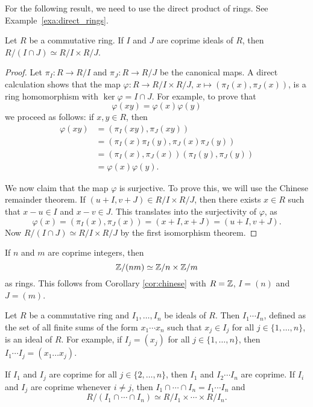 For the following result, we need 
to use the direct product of rings. See Example~\ref{exa:direct_rings}. 

\begin{corollary}
\label{cor:chinese}
	Let $R$ be a commutative ring. If $I$ and $J$ are coprime ideals of $R$, 
	then $R/(I\cap J)\simeq R/I\times R/J$.
\end{corollary}

\begin{proof}
	Let $\pi_I\colon R\to R/I$ and $\pi_J\colon R\to R/J$ be the canonical maps. A direct 
	calculation shows that the
	map $\varphi\colon R\to R/I\times R/J$, $x\mapsto (\pi_I(x),\pi_J(x))$, 
	is a ring homomorphism with $\ker\varphi=I\cap J$. For example, to prove
 that 
 \[
 \varphi(xy)=\varphi(x)\varphi(y)
 \]
 we proceed as follows: if $x,y\in R$, then 
        \begin{align*}
            \varphi(xy) &= (\pi_I(xy),\pi_J(xy))\\
            &= (\pi_I(x)\pi_I(y),\pi_J(x)\pi_J(y))\\
            &= (\pi_I(x),\pi_J(x))(\pi_I(y),\pi_J(y))\\
            &= \varphi(x)\varphi(y). 
        \end{align*}

 We now claim that the map $\varphi$ is surjective. To prove this, 
 we will use the Chinese remainder theorem. If $(u+I,v+J)\in R/I\times R/J$, 
	then there exists $x\in R$ such that 
	$x-u\in I$ and $x-v\in J$. This translates into the surjectivity of $\varphi$,
 as \[
 \varphi(x)=(\pi_I(x),\pi_J(x))=(x+I,x+J)=(u+I,v+J).
 \]
 Now
	$R/(I\cap J)\simeq R/I\times R/J$ by the first isomorphism theorem. 
\end{proof}

\begin{example}
    If $n$ and $m$ are coprime integers, then
    \[
    \mathbb{Z}/(nm)\simeq \mathbb{Z}/n\times \mathbb{Z}/m
    \]
    as rings. This follows from Corollary \ref{cor:chinese} with 
    $R=\mathbb{Z}$, $I=(n)$ and $J=(m)$. 
\end{example}

Let $R$ be a commutative ring and $I_1,\dots,I_n$ be ideals of $R$. Then
$I_1\cdots I_n$, defined as the set of all finite sums of the form 
$x_1\cdots x_n$ such that $x_j\in I_j$ for all $j\in\{1,\dots,n\}$, 
is an ideal of $R$. For example, if $I_j=(x_j)$ for all $j\in\{1,\dots,n\}$, 
then $I_1\cdots I_j=(x_1\dots x_j)$. 

If $I_1$ and $I_j$ are coprime for all $j\in\{2,\dots,n\}$, 
then $I_1$ and $I_2\cdots I_n$ are coprime. If $I_i$ and $I_j$ are coprime
whenever $i\ne j$, then 
$I_1\cap\cdots\cap I_n=I_1\cdots I_n$ and 
\[
R/(I_1\cap\cdots\cap I_n)\simeq R/I_1\times\cdots\times R/I_n.
\]

